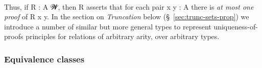 \ccpad
\begin{code}%
\>[1]\AgdaSpace{}%
\AgdaSymbol{:}\AgdaSpace{}%
\AgdaSpace{}%
\AgdaSpace{}%
\AgdaSpace{}%
\AgdaSpace{}%
\AgdaSpace{}%
\AgdaSpace{}%
\AgdaSpace{}%
\<%
\\
%
\>[1]%
\>[25]\AgdaSpace{}%
\AgdaSymbol{=}\AgdaSpace{}%
\AgdaSpace{}%
\AgdaSpace{}%
\AgdaSpace{}%
\AgdaSpace{}%
\AgdaSpace{}%
\AgdaSymbol{(}\AgdaSpace{}%
\AgdaSpace{}%
\AgdaSymbol{)}\<%
\end{code}
\ccpad
Thus, if \ab R \as :  \ab A \ab 𝓦, then  \ab R asserts that for each pair \ab x \ab y \as : \ab A there is \emph{at most one proof} of \ab R \ab x \ab y. In the section on \emph{Truncation} below (\S~\ref{sec:trunc-sets-prop}) we introduce a number of similar but more general types to represent uniqueness-of-proofs principles for relations of arbitrary arity, over arbitrary types.







\subsubsection{Equivalence classes}\label{equivalence-classes}

